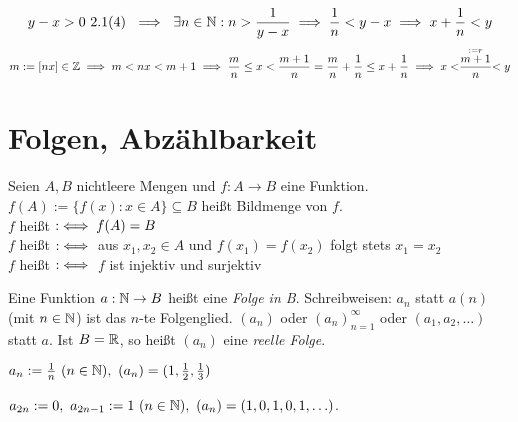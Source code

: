\documentclass[a4paper,twoside,DIV15,BCOR12mm]{scrbook}
\begin{document}
\begin{beweis}
$$ y-x > 0 \mbox{ 2.1(4) } \folgt \ \exists n \in \MdN: n > \frac{1}{y-x} \folgt \frac{1}{n} < y-x \folgt x + \frac{1}{n} < y $$
$$ m := [nx] \in \mathbb{Z} \implies m < nx < m+1 \implies \frac{m}{n} \le x < \frac{m+1}{n} = \frac{m}{n} + \frac{1}{n} \le x + \frac{1}{n} \implies x < \stackrel{:= r }{\frac{m+1}{n}} < y$$
\end{beweis}

\chapter{Folgen, Abzählbarkeit}

\begin{definition}
Seien $A,B$ nichtleere Mengen und $f: A \rightarrow B$ eine Funktion. $f(A) := \{ f(x): x \in A \} \subseteq B$ heißt Bildmenge von $f$. \\
$f$ heißt  $:\iff f(A)=B$ \\
$f$ heißt  $:\iff $ aus $x_1,x_2 \in A$ und $f(x_1) = f(x_2)$ folgt stets $x_1=x_2$ \\
$f$ heißt  $:\iff$ $f$ ist injektiv und surjektiv
\end{definition}

\begin{definition}
Eine Funktion $a:\mathbb{N} \rightarrow B$ heißt eine \textit{Folge in B}. Schreibweisen: $a_n$ statt $a(n)$ (mit $n \in \mathbb{N}$) ist das $n$-te Folgenglied. $(a_n)$ oder $(a_n)_{n=1}^\infty$ oder $(a_1, a_2,\ldots)$ statt $a$. Ist $B=\mathbb{R}$, so heißt $(a_n)$ eine \textit{reelle Folge}.
\end{definition}

\begin{beispiele}
\item $a_n := \frac{1}{n} \ (n \in \mathbb{N}), \ (a_n) = (1,\frac{1}{2},\frac{1}{3})$ \\
\item $a_{2n} := 0,\  a_{2n-1} := 1 \ (n \in \mathbb{N}), \ (a_n) = (1,0,1,0,1,\ldots)$.
\end{beispiele}
\end{document}

